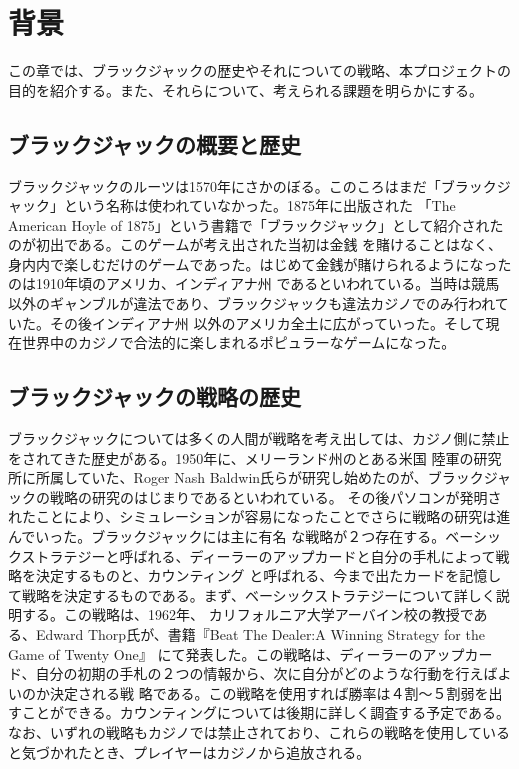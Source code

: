 \section{背景}
この章では、ブラックジャックの歴史やそれについての戦略、本プロジェクトの目的を紹介する。また、それらについて、考えられる課題を明らかにする。

\subsection{ブラックジャックの概要と歴史}
ブラックジャックのルーツは1570年にさかのぼる。このころはまだ「ブラックジャック」という名称は使われていなかった。1875年に出版された
「The American Hoyle of 1875」という書籍で「ブラックジャック」として紹介されたのが初出である。このゲームが考え出された当初は金銭
を賭けることはなく、身内内で楽しむだけのゲームであった。はじめて金銭が賭けられるようになったのは1910年頃のアメリカ、インディアナ州
であるといわれている。当時は競馬以外のギャンブルが違法であり、ブラックジャックも違法カジノでのみ行われていた。その後インディアナ州
以外のアメリカ全土に広がっていった。そして現在世界中のカジノで合法的に楽しまれるポピュラーなゲームになった。

\subsection{ブラックジャックの戦略の歴史}
ブラックジャックについては多くの人間が戦略を考え出しては、カジノ側に禁止をされてきた歴史がある。1950年に、メリーランド州のとある米国
陸軍の研究所に所属していた、Roger Nash Baldwin氏らが研究し始めたのが、ブラックジャックの戦略の研究のはじまりであるといわれている。
その後パソコンが発明されたことにより、シミュレーションが容易になったことでさらに戦略の研究は進んでいった。ブラックジャックには主に有名
な戦略が２つ存在する。ベーシックストラテジーと呼ばれる、ディーラーのアップカードと自分の手札によって戦略を決定するものと、カウンティング
と呼ばれる、今まで出たカードを記憶して戦略を決定するものである。まず、ベーシックストラテジーについて詳しく説明する。この戦略は、1962年、
カリフォルニア大学アーバイン校の教授である、Edward Thorp氏が、書籍『Beat The Dealer:A Winning Strategy for the Game of Twenty One』
にて発表した。この戦略は、ディーラーのアップカード、自分の初期の手札の２つの情報から、次に自分がどのような行動を行えばよいのか決定される戦
略である。この戦略を使用すれば勝率は４割～５割弱を出すことができる。カウンティングについては後期に詳しく調査する予定である。
なお、いずれの戦略もカジノでは禁止されており、これらの戦略を使用していると気づかれたとき、プレイヤーはカジノから追放される。
